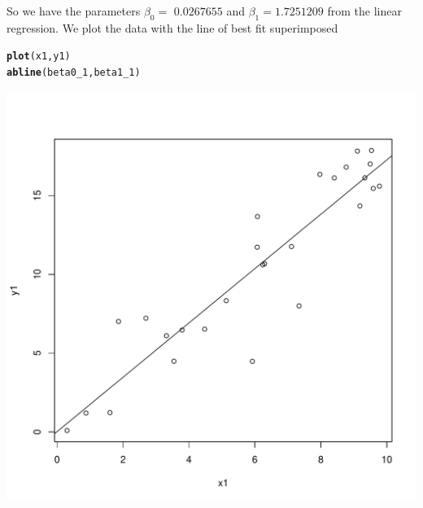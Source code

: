 \documentclass{article}\usepackage[]{graphicx}\usepackage[]{color}
\makeatletter
\def\maxwidth{ %
  \ifdim\Gin@nat@width>\linewidth
    \linewidth
  \else
    \Gin@nat@width
  \fi
}
\newcommand{\hlstd}[1]{\textcolor[rgb]{0.345,0.345,0.345}{#1}}%
\newcommand{\hlkwd}[1]{\textcolor[rgb]{0.737,0.353,0.396}{\textbf{#1}}}%
\newenvironment{kframe}{%
 \def\at@end@of@kframe{}%
 \ifinner\ifhmode%
  \def\at@end@of@kframe{\end{minipage}}%
  \begin{minipage}{\columnwidth}%
 \fi\fi%
 \def\FrameCommand##1{\hskip\@totalleftmargin \hskip-\fboxsep
 \colorbox{shadecolor}{##1}\hskip-\fboxsep
     \hskip-\linewidth \hskip-\@totalleftmargin \hskip\columnwidth}%
 \MakeFramed {\advance\hsize-\width
   \@totalleftmargin\z@ \linewidth\hsize
   \@setminipage}}%
 {\par\unskip\endMakeFramed%
 \at@end@of@kframe}
\newenvironment{knitrout}{}{} %
\makeatother
\begin{document}
So we have the parameters $\beta_0 = $ $0.0267655$ and $\beta_1 = 1.7251209$ from the linear regression. We plot the data with the line of best fit superimposed
\begin{knitrout}
\color{fgcolor}\begin{kframe}
\begin{alltt}
\hlkwd{plot}\hlstd{(x1,y1)}
\hlkwd{abline}\hlstd{(beta0_1, beta1_1)}
\end{alltt}
\end{kframe}
\includegraphics[width=\maxwidth]{figure/unnamed-chunk-2-1} 

\end{knitrout}


\clearpage
\end{document}
